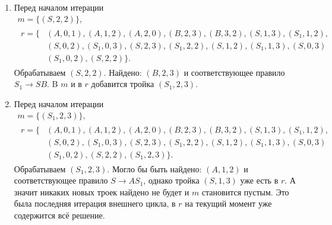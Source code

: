 \begin{example}
\begin{enumerate}
\begin{gather*}
                  \begin{aligned}
                      r = \{ & (A, 0, 1), (A, 1, 2), (A, 2, 0), (B, 2, 3), (B, 3, 2), (S, 1, 3), (S_1, 1, 2),    \\
                             & (S, 0, 2), (S_1, 0, 3), (S, 2, 3), (S_1, 2, 2), (S, 1, 2), (S_1, 1, 3), (S, 0, 3) \\
                             & (S_1, 0, 2)\}.
                  \end{aligned}
              \end{gather*}
              Обрабатываем $(S_1, 0, 2)$.
              Найдено: $(A, 2, 0)$ и соответствующее правило $S \to A S_1$.
              B $m$ и в $r$ добавится тройка $(S, 2, 2)$.
        \item Перед началом итерации
              \begin{gather*}
                  m = \{(S, 2, 2)\}, \\
                  \begin{aligned}
                      r = \{ & (A, 0, 1), (A, 1, 2), (A, 2, 0), (B, 2, 3), (B, 3, 2), (S, 1, 3), (S_1, 1, 2),    \\
                             & (S, 0, 2), (S_1, 0, 3), (S, 2, 3), (S_1, 2, 2), (S, 1, 2), (S_1, 1, 3), (S, 0, 3) \\
                             & (S_1, 0, 2), (S, 2, 2)\}.
                  \end{aligned}
              \end{gather*}
              Обрабатываем $(S, 2, 2)$.
              Найдено: $(B, 2, 3)$ и соответствующее правило $S_1 \to S B$.
              B $m$ и в $r$ добавится тройка $(S_1, 2, 3)$.
        \item Перед началом итерации
              \begin{gather*}
                  m = \{(S_1, 2, 3)\}, \\
                  \begin{aligned}
                      r = \{ & (A, 0, 1), (A, 1, 2), (A, 2, 0), (B, 2, 3), (B, 3, 2), (S, 1, 3), (S_1, 1, 2),    \\
                             & (S, 0, 2), (S_1, 0, 3), (S, 2, 3), (S_1, 2, 2), (S, 1, 2), (S_1, 1, 3), (S, 0, 3) \\
                             & (S_1, 0, 2), (S, 2, 2), (S_1, 2, 3)\}.
                  \end{aligned}
              \end{gather*}
              Обрабатываем $(S_1, 2, 3)$.
              Могло бы быть найдено: $(A,1,2)$ и соответствующее правило $S \to A S_1$, однако тройка $(S, 1, 3)$ уже есть в $r$.
              А значит никаких новых троек найдено не будет и $m$ становится пустым.
              Это была последняя итерация внешнего цикла, в $r$ на текущий момент уже содержится всё решение.
    \end{enumerate}
\end{example}

